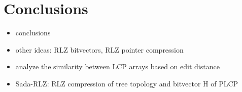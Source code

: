 
\section{Conclusions}\label{section:conclusions}

\begin{itemize}
\item conclusions
\item other ideas: RLZ bitvectors, RLZ pointer compression
\item analyze the similarity between LCP arrays based on edit distance
\item Sada-RLZ: RLZ compression of tree topology and bitvector H of PLCP
\end{itemize}

